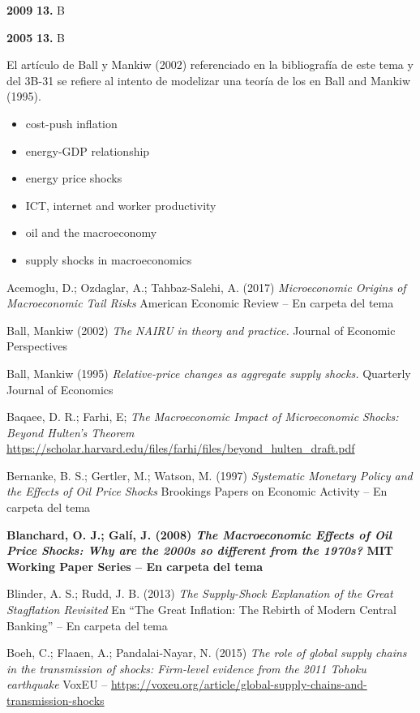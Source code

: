 \documentclass{nuevotema}
\begin{document}
\notas

\textbf{2009} \textbf{13.} B

\textbf{2005} \textbf{13.} B

El artículo de Ball y Mankiw (2002) referenciado en la bibliografía de este tema y del 3B-31 se refiere al intento de modelizar una teoría de los  en Ball and Mankiw (1995).

\bibliografia

\begin{itemize}
	\item cost-push inflation
	\item energy-GDP relationship
	\item energy price shocks
	\item ICT, internet and worker productivity
	\item oil and the macroeconomy
	\item supply shocks in macroeconomics
\end{itemize}

Acemoglu, D.; Ozdaglar, A.; Tahbaz-Salehi, A. (2017) \textit{Microeconomic Origins of Macroeconomic Tail Risks} American Economic Review -- En carpeta del tema

Ball, Mankiw (2002) \textit{The NAIRU in theory and practice.} Journal of Economic Perspectives

Ball, Mankiw (1995) \textit{Relative-price changes as aggregate supply shocks.} Quarterly Journal of Economics

Baqaee, D. R.; Farhi, E; \textit{The Macroeconomic Impact of Microeconomic
Shocks: Beyond Hulten’s Theorem} \url{https://scholar.harvard.edu/files/farhi/files/beyond_hulten_draft.pdf}

Bernanke, B. S.; Gertler, M.; Watson, M. (1997) \textit{Systematic Monetary Policy and the Effects of Oil Price Shocks} Brookings Papers on Economic Activity -- En carpeta del tema

\textbf{Blanchard, O. J.; Galí, J. (2008) \textit{The Macroeconomic Effects of Oil Price Shocks: Why are the 2000s so different from the 1970s?} MIT Working Paper Series -- En carpeta del tema}

Blinder, A. S.; Rudd, J. B. (2013) \textit{The Supply-Shock Explanation of the Great Stagflation Revisited} En ``The Great Inflation: The Rebirth of Modern Central Banking'' -- En carpeta del tema

Boeh, C.; Flaaen, A.; Pandalai-Nayar, N. (2015) \textit{The role of global supply chains in the transmission of shocks: Firm-level evidence from the 2011 Tohoku earthquake} VoxEU -- \url{https://voxeu.org/article/global-supply-chains-and-transmission-shocks}
\end{document}
